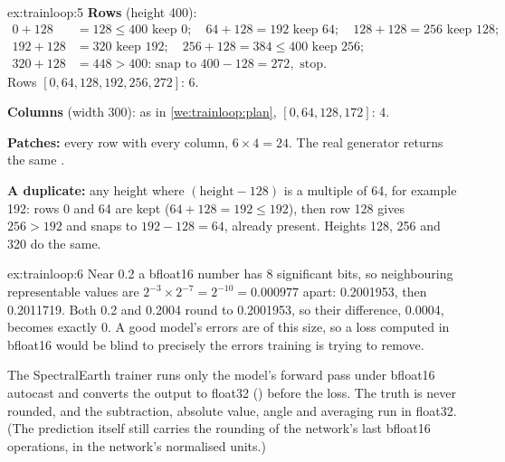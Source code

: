 \begin{solution}{ex:trainloop:5}
\textbf{Rows} (height 400):
\begin{align*}
0 + 128 &= 128 \le 400 \text{ keep } 0;\quad 64 + 128 = 192 \text{ keep } 64;\quad 128 + 128 = 256 \text{ keep } 128;\\
192 + 128 &= 320 \text{ keep } 192;\quad 256 + 128 = 384 \le 400 \text{ keep } 256;\\
320 + 128 &= 448 > 400 \text{: snap to } 400 - 128 = 272, \text{ stop.}
\end{align*}
Rows $[0, 64, 128, 192, 256, 272]$: 6.

\textbf{Columns} (width 300): as in \cref{we:trainloop:plan}, $[0, 64, 128, 172]$: 4.

\textbf{Patches:} every row with every column, $6 \times 4 = 24$. The real generator returns the
same \tagC.

\textbf{A duplicate:} any height where $(\text{height} - 128)$ is a multiple of 64, for example
192: rows 0 and 64 are kept ($64 + 128 = 192 \le 192$), then row 128 gives $256 > 192$ and snaps
to $192 - 128 = 64$, already present. Heights 128, 256 and 320 do the same.
\end{solution}

\begin{solution}{ex:trainloop:6}
Near 0.2 a bfloat16 number has 8 significant bits, so neighbouring representable values are
$2^{-3} \times 2^{-7} = 2^{-10} = 0.000977$ apart: 0.2001953, then 0.2011719. Both 0.2 and
0.2004 round to 0.2001953, so their difference, 0.0004, becomes exactly 0. A good model's errors
are of this size, so a loss computed in bfloat16 would be blind to precisely the errors training
is trying to remove.

The SpectralEarth trainer runs only the model's forward pass under bfloat16 autocast and
converts the output to float32 () before the loss. The truth is never rounded,
and the subtraction, absolute value, angle and averaging run in float32. (The prediction itself
still carries the rounding of the network's last bfloat16 operations, in the network's
normalised units.)
\end{solution}
